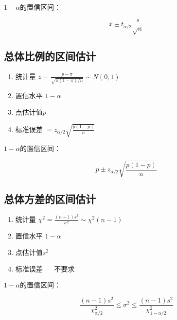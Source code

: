 \documentclass[UTF8,10pt]{book}
\begin{document}
                    $1-\alpha $的置信区间：
                        
                        $$ \overline{x} \pm  t_{\alpha / 2} \frac{s}{\sqrt{n}}  $$
                        


            \subsection{总体比例的区间估计}

                    {\kaishu

                    \begin{enumerate}
                        \item 统计量 $ z = \frac{p-\pi}{\sqrt{\pi (1-\pi)/n}}  \sim N(0,1)$
                        \item 置信水平 $1-\alpha$
                        \item 点估计值$p$
                        \item 标准误差 $ = z_{\alpha / 2} \sqrt{\frac{p(1-p)}{n}} $
                    \end{enumerate}                                  
                    }

                    $1-\alpha$的置信区间：

                        $$ p \pm z_{\alpha / 2} \sqrt{\frac{p(1-p)}{n}} $$

            \subsection{总体方差的区间估计}
                    {\kaishu

                    \begin{enumerate}
                        \item 统计量 $ \chi^2 = \frac{(n-1)s^2}{\sigma^2} \sim \chi^2(n-1)$
                        \item 置信水平 $1-\alpha$
                        \item 点估计值$s^2$
                        \item 标准误差 $ \quad $ 不要求
                    \end{enumerate}                                  
                    }

                    $1-\alpha$的置信区间：

                       $$ \frac{(n-1) s^2}{\chi^2_{\alpha/2}} \leq  \sigma^2  \leq  \frac{(n-1) s^2}{\chi^2_{1-\alpha/2}}$$
\end{document}

